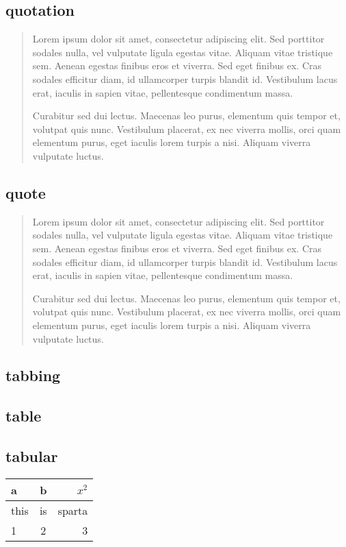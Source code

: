 \documentclass[11pt]{article}
\begin{document}
\subsection{quotation}
\begin{quotation}
    Lorem ipsum dolor sit amet, consectetur adipiscing elit. Sed porttitor sodales nulla, vel vulputate ligula egestas vitae. Aliquam vitae tristique sem. Aenean egestas finibus eros et viverra. Sed eget finibus ex. Cras sodales efficitur diam, id ullamcorper turpis blandit id. Vestibulum lacus erat, iaculis in sapien vitae, pellentesque condimentum massa.
    
    Curabitur sed dui lectus. Maecenas leo purus, elementum quis tempor et, volutpat quis nunc. Vestibulum placerat, ex nec viverra mollis, orci quam elementum purus, eget iaculis lorem turpis a nisi. Aliquam viverra vulputate luctus.
\end{quotation}

\subsection{quote}
\begin{quote}
    Lorem ipsum dolor sit amet, consectetur adipiscing elit. Sed porttitor sodales nulla, vel vulputate ligula egestas vitae. Aliquam vitae tristique sem. Aenean egestas finibus eros et viverra. Sed eget finibus ex. Cras sodales efficitur diam, id ullamcorper turpis blandit id. Vestibulum lacus erat, iaculis in sapien vitae, pellentesque condimentum massa.
    
    Curabitur sed dui lectus. Maecenas leo purus, elementum quis tempor et, volutpat quis nunc. Vestibulum placerat, ex nec viverra mollis, orci quam elementum purus, eget iaculis lorem turpis a nisi. Aliquam viverra vulputate luctus.
\end{quote}

\subsection{tabbing} %

\subsection{table} %

\subsection{tabular}
\begin{tabular}[h]{l|cr}
    a & b & $x^2$\\\hline
    this & is & sparta\\
    1 & 2 & 3
\end{tabular}
\end{document}
